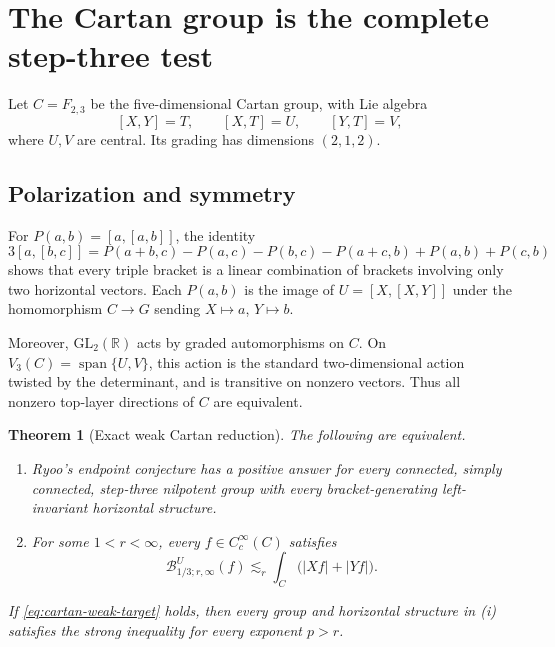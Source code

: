 \documentclass[11pt]{article}
\newtheorem{theorem}{Theorem}[section]
\theoremstyle{definition}
\theoremstyle{remark}
\newcommand{\R}{\mathbb R}
\newcommand{\abs}[1]{\lvert #1\rvert}
\newcommand{\Bw}[3]{\mathcal B^{#1}_{#2;#3,\infty}}
\newcommand{\less}{\lesssim}
\DeclareMathOperator{\spanop}{span}
\begin{document}
\section{The Cartan group is the complete step-three test}\label{sec:cartan}

Let \(C=F_{2,3}\) be the five-dimensional Cartan group, with Lie algebra
\begin{equation}\label{eq:cartan-brackets}
 [X,Y]=T,\qquad [X,T]=U,\qquad [Y,T]=V,
\end{equation}
where \(U,V\) are central.  Its grading has dimensions \((2,1,2)\).

\subsection{Polarization and symmetry}

For \(P(a,b)=[a,[a,b]]\), the identity
\begin{equation}\label{eq:polarization}
 3[a,[b,c]]=
 P(a+b,c)-P(a,c)-P(b,c)-P(a+c,b)+P(a,b)+P(c,b)
\end{equation}
shows that every triple bracket is a linear combination of brackets involving only two
horizontal vectors.  Each \(P(a,b)\) is the image of \(U=[X,[X,Y]]\) under the
homomorphism \(C\to G\) sending \(X\mapsto a\), \(Y\mapsto b\).

Moreover, \(\mathrm{GL}_2(\R)\) acts by graded automorphisms on \(C\).  On
\(V_3(C)=\spanop\{U,V\}\), this action is the standard two-dimensional action twisted
by the determinant, and is transitive on nonzero vectors.  Thus all nonzero top-layer
directions of \(C\) are equivalent.

\begin{theorem}[Exact weak Cartan reduction]\label{thm:cartan-equivalence}
The following are equivalent.
\begin{enumerate}[label=(\roman*)]
\item Ryoo's endpoint conjecture has a positive answer for every connected, simply
connected, step-three nilpotent group with every bracket-generating left-invariant
horizontal structure.
\item For some \(1<r<\infty\), every \(f\in C_c^\infty(C)\) satisfies
\begin{equation}\label{eq:cartan-weak-target}
 \boxed{
 \Bw{U}{1/3}{r}(f)
 \less_r\int_C\bigl(\abs{Xf}+\abs{Yf}\bigr).}
\end{equation}
\end{enumerate}
If \eqref{eq:cartan-weak-target} holds, then every group and horizontal structure in
(i) satisfies the strong inequality for every exponent \(p>r\).
\end{theorem}
\end{document}
